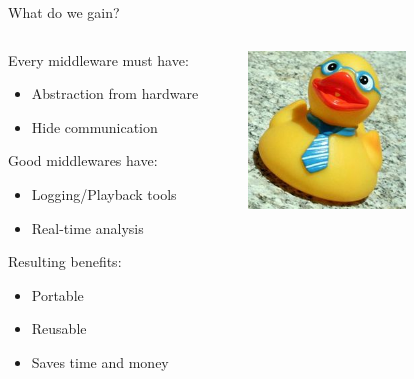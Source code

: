 \documentclass[aspectratio=43]{beamer}
\begin{document}
\begin{frame}{What do we gain?}
\begin{columns}
	\begin{column}{0.55\textwidth}
Every middleware must have:
		\begin{itemize}
			\item Abstraction from hardware
                          \item Hide communication
\end{itemize}

Good middlewares have:
\begin{itemize}
  \item Logging/Playback tools
                              \item Real-time analysis
\end{itemize}

Resulting benefits:
\begin{itemize}
                        \item Portable
                        \item Reusable
                        \item Saves time and money
		\end{itemize} 
        \end{column} 
        \begin{column}{0.45\textwidth} 
          \centering 
          \includegraphics[width=0.6\textwidth]{fig/yay-duckie.jpg} 
        \end{column}
\end{columns}

\end{frame}
\end{document}
